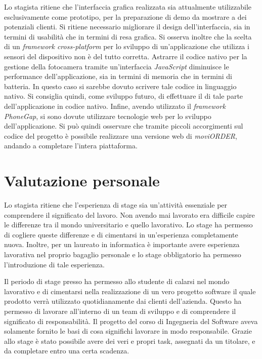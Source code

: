 Lo stagista ritiene che l'interfaccia grafica realizzata sia attualmente utilizzabile esclusivamente come prototipo, per la preparazione di demo da mostrare a dei potenziali clienti. Si ritiene necessario migliorare il design dell'interfaccia, sia in termini di usabilità che in termini di resa grafica. 
Si osserva inoltre che la scelta di un \textit{framework cross-platform} per lo sviluppo di un'applicazione che utilizza i sensori del dispositivo non è del tutto corretta. Astrarre il codice nativo per la gestione della fotocamera tramite un'interfaccia \textit{JavaScript} diminuisce le performance dell'applicazione, sia in termini di memoria che in termini di batteria. In questo caso si sarebbe dovuto scrivere tale codice in linguaggio nativo. Si consiglia quindi, come sviluppo futuro, di effettuare il  di tale parte dell'applicazione in codice nativo.
Infine, avendo utilizzato il \textit{framework PhoneGap}, si sono dovute utilizzare tecnologie web per lo sviluppo dell'applicazione. Si può quindi osservare che tramite piccoli accorgimenti sul codice del progetto è possibile realizzare una versione web di \textit{moviORDER}, andando a completare l'intera piattaforma.

\section{Valutazione personale}

Lo stagista ritiene che l'esperienza di stage sia un'attività essenziale per comprendere il significato del lavoro. Non avendo mai lavorato era difficile capire le differenze tra il mondo universitario e quello lavorativo. Lo stage ha permesso di cogliere queste differenze e di cimentarsi in un'esperienza completamente nuova. Inoltre, per un laureato in informatica è importante avere esperienza lavorativa nel proprio bagaglio personale e lo stage obbligatorio ha permesso l'introduzione di tale esperienza.

Il periodo di stage presso \visione{} ha permesso allo studente di calarsi nel mondo lavorativo e di cimentarsi nella realizzazione di un vero progetto software il quale prodotto verrà utilizzato quotidianamente dai clienti dell'azienda. Questo ha permesso di lavorare all'interno di un team di sviluppo e di comprendere il significato di responsabilità. Il progetto del corso di Ingegneria del Software aveva solamente fornito le basi di cosa significhi lavorare in modo responsabile. Grazie allo stage è stato possibile avere dei veri e propri task, assegnati da un titolare, e da completare entro una certa scadenza.

